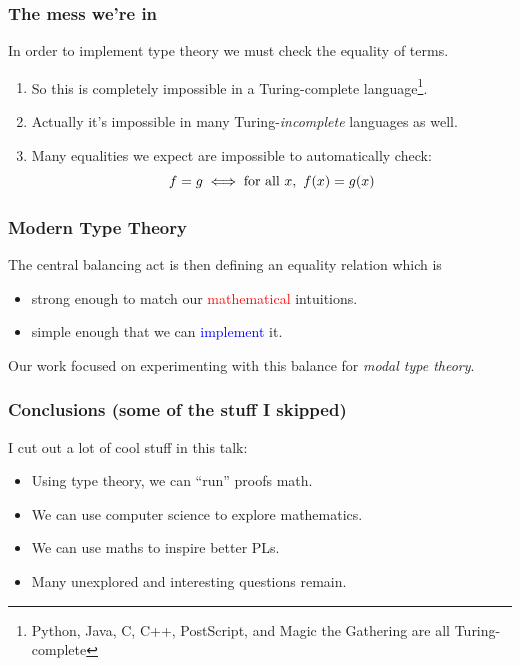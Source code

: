 \documentclass[usenames,dvipsnames,aspectratio=169,12pt]{beamer}
\begin{document}
\begin{frame}
  \frametitle{The mess we're in}
  In order to implement type theory we must check the equality of terms.
  \begin{enumerate}
  \item So this is completely impossible in a Turing-complete language\footnote{Python, Java, C,
      C++, PostScript, and Magic the Gathering are all Turing-complete}.
  \item Actually it's impossible in many Turing-\emph{incomplete} languages as well.
  \item Many equalities we expect are impossible to automatically check:
    \[
      f = g \iff \text{for all } x,\ f(x) = g(x)
    \]
  \end{enumerate}
\end{frame}

\begin{frame}
  \frametitle{Modern Type Theory}
  The central balancing act is then defining an equality relation which is
  \begin{itemize}
  \item strong enough to match our \textcolor{Red}{mathematical} intuitions.
  \item simple enough that we can \textcolor{Blue}{implement} it.
  \end{itemize}
  \bigskip

  Our work focused on experimenting with this balance for \emph{modal type theory}.
\end{frame}



\begin{frame}
  \frametitle{Conclusions (some of the stuff I skipped)}
  I cut out a lot of cool stuff in this talk:
  \begin{itemize}
  \item Using type theory, we can ``run'' proofs math.
  \item We can use computer science to explore mathematics.
  \item We can use maths to inspire better PLs.
  \item Many unexplored and interesting questions remain.
  \end{itemize}
\end{frame}
\end{document}
